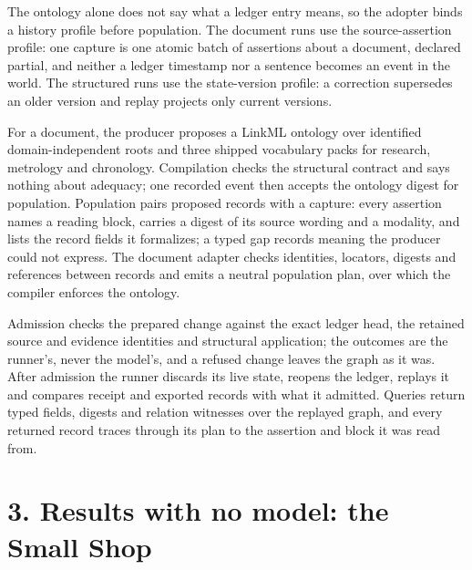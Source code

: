 The ontology alone does not say what a ledger entry means, so the adopter binds a history profile before population. The document runs use the source-assertion profile: one capture is one atomic batch of assertions about a document, declared partial, and neither a ledger timestamp nor a sentence becomes an event in the world. The structured runs use the state-version profile: a correction supersedes an older version and replay projects only current versions.

For a document, the producer proposes a LinkML ontology over identified domain-independent roots and three shipped vocabulary packs for research, metrology and chronology. Compilation checks the structural contract and says nothing about adequacy; one recorded event then accepts the ontology digest for population. Population pairs proposed records with a capture: every assertion names a reading block, carries a digest of its source wording and a modality, and lists the record fields it formalizes; a typed gap records meaning the producer could not express. The document adapter checks identities, locators, digests and references between records and emits a neutral population plan, over which the compiler enforces the ontology.

Admission checks the prepared change against the exact ledger head, the retained source and evidence identities and structural application; the outcomes are the runner's, never the model's, and a refused change leaves the graph as it was. After admission the runner discards its live state, reopens the ledger, replays it and compares receipt and exported records with what it admitted. Queries return typed fields, digests and relation witnesses over the replayed graph, and every returned record traces through its plan to the assertion and block it was read from.

\section*{3. Results with no model: the Small Shop}

